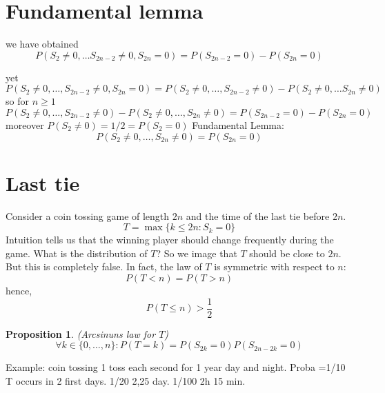 \documentclass[10pt,a4paper]{book}
\newtheorem{proposition}[theorem]{Proposition}
\theoremstyle{definition}
\begin{document}
\section{Fundamental lemma}
we have obtained 
$$P(S_2\neq 0,\ldots S_{2n-2}\neq 0,S_{2n}=0)=P(S_{2n-2}=0)-P(S_{2n}=0)$$


yet
$$P(S_2\neq0,\ldots,S_{2n-2}\neq 0,S_{2n}=0)=P(S_2\neq 0,\ldots,S_{2n-2}\neq 0)-P(S_2\neq 0,\ldots S_{2n}\neq 0)$$
so for $n\geq 1$
$$P(S_2\neq 0,\ldots, S_{2n-2}\neq 0)-P(S_2\neq 0,\ldots, S_{2n}\neq 0)=P(S_{2n-2}=0)-P(S_{2n}=0)$$
moreover $P(S_2\neq 0)=1/2=P(S_2=0)$
Fundamental Lemma:
$$P(S_2\neq 0,\ldots,S_{2n}\neq 0)=P(S_{2n}=0)$$


\section{Last tie}
Consider a coin tossing game of length $2n$ and the time of the last tie before $2n$.
$$T=\max\{k\leq 2n: S_k=0\}$$
Intuition tells us that the winning player should change frequently during the game. What is the distribution of $T$? So we image that $T$ should be close to $2n$. But this is
completely false. In fact, the law of $T$ is symmetric with respect to $n$:
$$P(T<n)=P(T>n)$$
hence,
$$P(T\leq n)>\frac{1}{2}$$
\begin{proposition}(Arcsinuns law for $T$)
$$\forall k\in\{0,\ldots,n\}: P(T=k)=P(S_{2k}=0)P(S_{2n-2k}=0)$$
\end{proposition}
Example: coin tossing 1 toss each second for 1 year day and night. Proba =1/10 T occurs in 2 first days. 1/20 2,25 day. 1/100 2h 15 min. 
\end{document}
